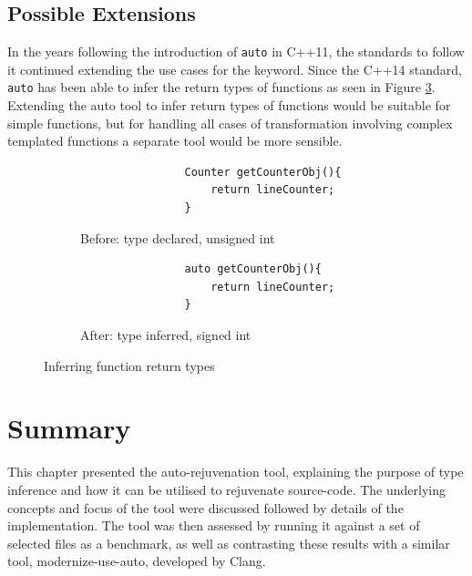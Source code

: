 \documentclass[bsc,frontabs,singlespacing,twoside,parskip,deptreport]{infthesis}
\begin{document}

\subsection{Possible Extensions}
In the years following the introduction of \texttt{auto} in C++11, the standards to follow it continued extending the use cases for the keyword. Since the C++14 standard, \texttt{auto} has been able to infer the return types of functions as seen in Figure \ref{fig:funct-ret-inferred}. Extending the auto tool to infer return types of functions would be suitable for simple functions, but for handling all cases of transformation involving complex templated functions a separate tool would be more sensible.

\begin{figure}[!h]
    \centering
    \begin{subfigure}[h]{\textwidth}
        \centering
        \begin{verbatim}
                Counter getCounterObj(){
                    return lineCounter;
                }
        \end{verbatim}
        \caption{Before: type declared, unsigned int}
        \label{fig:funct-ret-inferred-before}
        \vspace{0.40cm}
    \end{subfigure}
    \begin{subfigure}[h]{\textwidth}
        \centering
        \begin{verbatim}
                auto getCounterObj(){
                    return lineCounter;
                }
        \end{verbatim}
        \caption{After: type inferred, signed int}
        \label{fig:funct-ret-inferred-after}
    \end{subfigure}
    \caption{Inferring function return types}
    \label{fig:funct-ret-inferred}
\end{figure}


\section{Summary}%
This chapter presented the auto-rejuvenation tool, explaining the purpose of type inference and how it can be utilised to rejuvenate source-code. The underlying concepts and focus of the tool were discussed followed by details of the implementation. The tool was then assessed by running it against a set of selected files as a benchmark, as well as contrasting these results with a similar tool, modernize-use-auto, developed by Clang. 
\end{document}
